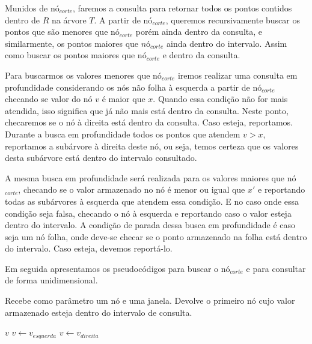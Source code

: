 Munidos de nó$_{corte}$, faremos a consulta para retornar todos os pontos contidos dentro de $R$ na árvore $T$. A partir de nó$_{corte}$, queremos recursivamente buscar os pontos que são menores que nó$_{corte}$ porém ainda dentro da consulta, e similarmente, os pontos maiores que $nó_{corte}$ ainda dentro do intervalo. Assim como buscar os pontos maiores que nó$_{corte}$ e dentro da consulta. \cite{cg_search1}

Para buscarmos os valores menores que nó$_{corte}$ iremos realizar uma consulta em profundidade considerando os nós não folha à esquerda a partir de nó$_{corte}$ checando se valor do nó $v$ é maior que $x$. Quando essa condição não for mais atendida, %
isso significa que já não mais está dentro da consulta. Neste ponto, checaremos se o nó à direita está dentro da consulta. Caso esteja, reportamos. Durante a busca em profundidade todos os pontos que atendem $v > x$, reportamos a subárvore à direita deste nó, ou seja, temos certeza que os valores desta subárvore está dentro do intervalo consultado.

A mesma busca em profundidade será realizada para os valores maiores que nó$_{corte}$, checando se o valor armazenado no nó é menor ou igual que $x'$ e reportando todas as subárvores à esquerda que atendem essa condição. E no caso onde essa condição seja falsa, checando o nó à esquerda e reportando caso o valor esteja dentro do intervalo. A condição de parada dessa busca em profundidade é caso seja um nó folha, onde deve-se checar se o ponto armazenado na folha está dentro do intervalo. Caso esteja, devemos reportá-lo.

Em seguida apresentamos os pseudocódigos para buscar o nó$_{corte}$ e para consultar de forma unidimensional.

\begin{algorithm}[h!]
    \caption{Recebe como parâmetro um nó e uma janela. Devolve o primeiro nó cujo valor armazenado esteja dentro do intervalo de consulta.}
    \begin{algorithmic}[1]
            \Return $v$
        \Else
                \State $v \leftarrow v_{esquerda}$ 
            \Else
                \State $v \leftarrow v_{direita}$
            \EndIf
        \EndIf
        \EndWhile
    \EndFunction
    \end{algorithmic}
\end{algorithm}


